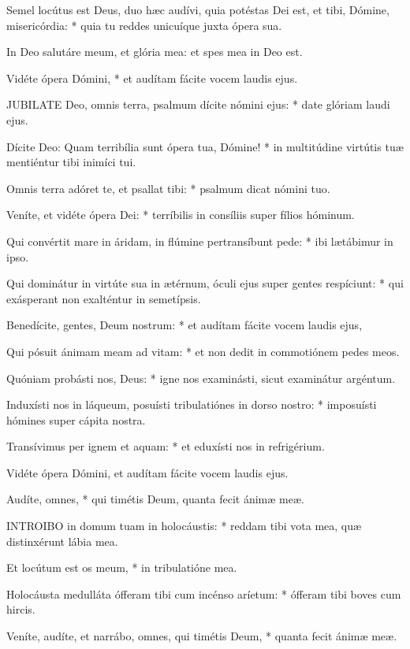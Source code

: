 Semel locútus est Deus, duo hæc audívi, quia potéstas Dei est, et tibi, Dómine, misericórdia: * quia tu reddes unicuíque juxta ópera sua.

 In Deo salutáre meum, et glória mea: et spes mea in Deo est.

 Vidéte ópera Dómini, * et audítam fácite vocem laudis ejus.


\lettrine[lines=2]{J}{UBILATE} Deo, omnis terra, psalmum dícite nómini ejus: * date glóriam laudi ejus.

Dícite Deo: Quam terribília sunt ópera tua, Dómine! * in multitúdine virtútis tuæ mentiéntur tibi inimíci tui.

Omnis terra adóret te, et psallat tibi: * psalmum dicat nómini tuo.

Veníte, et vidéte ópera Dei: * terríbilis in consíliis super fílios hóminum.

Qui convértit mare in áridam, in flúmine pertransíbunt pede: * ibi lætábimur in ipso.

Qui dominátur in virtúte sua in ætérnum, óculi ejus super gentes respíciunt: * qui exásperant non exalténtur in semetípsis.

Benedícite, gentes, Deum nostrum: * et audítam fácite vocem laudis ejus,

Qui pósuit ánimam meam ad vitam: * et non dedit in commotiónem pedes meos.

Quóniam probásti nos, Deus: * igne nos examinásti, sicut examinátur argéntum.

Induxísti nos in láqueum, posuísti tribulatiónes in dorso nostro: * imposuísti hómines super cápita nostra.

Transívimus per ignem et aquam: * et eduxísti nos in refrigérium.

 Vidéte ópera Dómini, et audítam fácite vocem laudis ejus.

 Audíte, omnes, * qui timétis Deum, quanta fecit ánimæ meæ.


\lettrine[lines=2]{I}{NTROIBO} in domum tuam in holocáustis: * reddam tibi vota mea, quæ distinxérunt lábia mea.

Et locútum est os meum, * in tribulatióne mea.

Holocáusta medulláta ófferam tibi cum incénso aríetum: * ófferam tibi boves cum hircis.

Veníte, audíte, et narrábo, omnes, qui timétis Deum, * quanta fecit ánimæ meæ.

